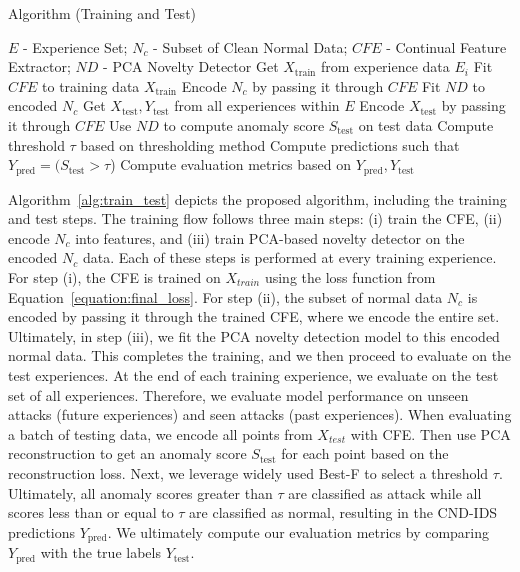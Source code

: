 \begin{algorithm}
    \caption{\Design{} Algorithm (Training and Test)}
    \label{alg:train_test}
    \begin{algorithmic}[1]
    \Require $E$ - Experience Set; $N_c$ - Subset of Clean Normal Data; $CFE$ - Continual Feature Extractor; $ND$ - PCA Novelty Detector
      \State Get $X_{\text{train}}$ from experience data $E_i$
      \State Fit $CFE$ to training data $X_{\text{train}}$
      \State Encode $N_c$ by passing it through $CFE$
      \State Fit $ND$ to encoded $N_c$
      \State Get $X_{\text{test}}, Y_{\text{test}}$ from all experiences within $E$
      \State Encode $X_{\text{test}}$ by passing it through $CFE$
      \State Use $ND$ to compute anomaly score $S_{\text{test}}$ on test data
      \State Compute threshold $\tau$ based on thresholding method
      \State Compute predictions such that $Y_{\text{pred}} = (S_{\text{test}} > \tau$)
      \State Compute evaluation metrics based on $Y_{\text{pred}}, Y_{\text{test}}$
    \EndFor
    \end{algorithmic}
\end{algorithm}
Algorithm~\ref{alg:train_test} depicts the proposed \Design{} algorithm, including the training and test steps. The training flow follows three main steps: (i) train the CFE, (ii) encode $N_c$ into features, and (iii) train PCA-based novelty detector on the encoded $N_c$ data. Each of these steps is performed at every training experience. For step (i), the CFE is trained on $X_{train}$ using the loss function from Equation~\ref{equation:final_loss}. For step (ii), the subset of normal data $N_c$ is encoded by passing it through the trained CFE, where we encode the entire set. Ultimately, in step (iii), we fit the PCA novelty detection model to this encoded normal data. This completes the \Design{} training, and we then proceed to evaluate on the test experiences. At the end of each training experience, we evaluate on the test set of all experiences. Therefore, we evaluate model performance on unseen attacks (future experiences) and seen attacks (past experiences). When evaluating a batch of testing data, we encode all points from $X_{test}$ with CFE. Then use PCA reconstruction to get an anomaly score $S_{\text{test}}$ for each point based on the reconstruction loss. Next, we leverage widely used Best-F \cite{su2019robust} to select a threshold $\tau$. Ultimately, all anomaly scores greater than $\tau$ are classified as attack while all scores less than or equal to $\tau$ are classified as normal, resulting in the CND-IDS predictions $Y_{\text{pred}}$. We ultimately compute our evaluation metrics by comparing $Y_{\text{pred}}$ with the true labels $Y_{\text{test}}$.   

